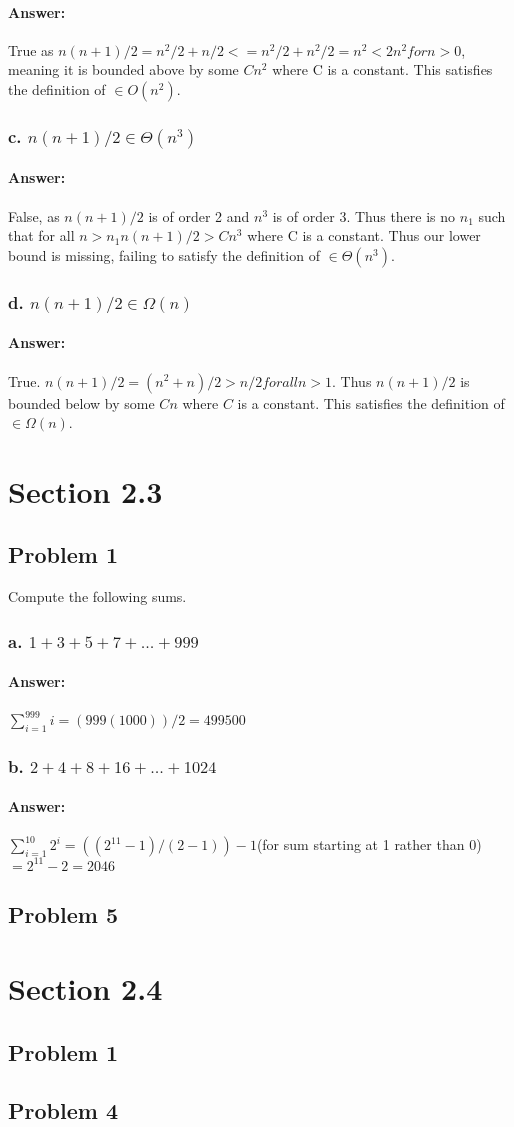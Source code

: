 \documentclass{article}
\begin{document}
    \paragraph{Answer:}
      True as $n(n+1)/2 = n^2/2 + n/2 <= n^2/2 + n^2/2 = n^2 < 2n^2 for n>0$, meaning it is bounded above by some $Cn^2$ where C is a constant. This satisfies the definition of $\in O(n^2)$.
  \subsubsection{c. $n(n + 1)/2 \in \Theta(n^3 )$}
    \paragraph{Answer:}
      False, as $n(n+1)/2$ is of order 2 and $n^3$ is of order 3. Thus there is no $n_{1}$ such that
      for all $n>n_{1} n(n+1)/2 > Cn^3$ where C is a constant. Thus our lower bound is missing, failing to satisfy the definition of $\in \Theta(n^3)$.
  \subsubsection{d. $n(n + 1)/2 \in \Omega(n)$}
    \paragraph{Answer:}
      True. $n(n+1)/2 = (n^2+n)/2 > n/2 for all n>1$. Thus $n(n+1)/2$ is bounded below by some $Cn$ where $C$ is a constant. This satisfies the definition of $\in \Omega(n)$.
\section{Section 2.3}
  \subsection{Problem 1}
    Compute the following sums.
  \subsubsection{a. $1 + 3 + 5 + 7 + . . . + 999$}
    \paragraph{Answer:}
      $\sum\limits_{i=1}^{999}i = (999(1000))/2 = 499500$
  \subsubsection{b. $2 + 4 + 8 + 16 + . . . + 1024$}
    \paragraph{Answer:}
      $\sum\limits_{i=1}^{10}2^i = ((2^11 - 1)/(2-1)) -1$(for sum starting at 1 rather than 0)$ = 2^11 -2 = 2046$
  \subsection{Problem 5}
\section{Section 2.4}
  \subsection{Problem 1}
  \subsection{Problem 4}
\end{document}
